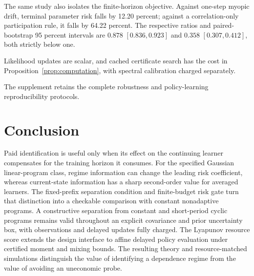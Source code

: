 \documentclass[journal]{IEEEtran}
\begin{document}
The same study also isolates the finite-horizon objective.
Against one-step myopic drift, terminal parameter risk falls by 12.20 percent; against a correlation-only participation rule, it falls by 64.22 percent.
The respective ratios and paired-bootstrap 95 percent intervals are $0.878$ $[0.836,0.923]$ and $0.358$ $[0.307,0.412]$, both strictly below one.

Likelihood updates are scalar, and cached certificate search has the cost in Proposition~\ref{prop:computation}, with spectral calibration charged separately.

The supplement retains the complete robustness and policy-learning reproducibility protocols.

\section{Conclusion}
Paid identification is useful only when its effect on the continuing learner compensates for the training horizon it consumes.
For the specified Gaussian linear-program class, regime information can change the leading risk coefficient, whereas current-state information has a sharp second-order value for averaged learners.
The fixed-prefix separation condition and finite-budget risk gate turn that distinction into a checkable comparison with constant nonadaptive programs.
A constructive separation from constant and short-period cyclic programs remains valid throughout an explicit covariance and prior uncertainty box, with observations and delayed updates fully charged.
The Lyapunov resource score extends the design interface to affine delayed policy evaluation under certified moment and mixing bounds.
The resulting theory and resource-matched simulations distinguish the value of identifying a dependence regime from the value of avoiding an uneconomic probe.



\end{document}
